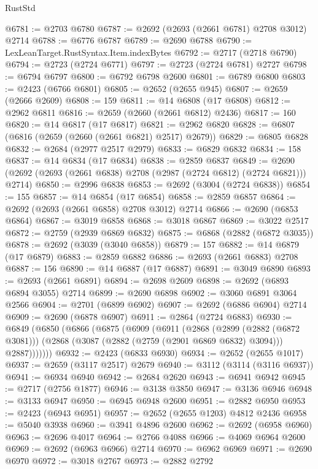 \begin{lexlean}{RustStd}
\begin{coremodule}
{\begin{coremodule}
{{{{{{{{{{{{{{{{{{{{{{{{{{{{{{{{{{{{{{{@6781 := @2703 @6780
@6787 := @2692 (@2693 (@2661 @6781) @2708 @3012) @2714
@6788 := @6776 @6787
@6789 := @2690 @6788
@6790 := LexLeanTarget.RustSyntax.Item.indexBytes
@6792 := @2717 (@2718 @6790)
@6794 := @2723 (@2724 @6771)
@6797 := @2723 (@2724 @6781) @2727
@6798 := @6794 @6797
@6800 := @6792 @6798 @2600
@6801 := @6789 @6800
@6803 := @2423 (@6766 @6801)
@6805 := @2652 (@2655 @945)
@6807 := @2659 (@2666 @2609)
@6808 := 159
@6811 := @14 @6808 (@17 @6808)
@6812 := @2962 @6811
@6816 := @2659 (@2660 (@2661 @6812) @2436)
@6817 := 160
@6820 := @14 @6817 (@17 @6817)
@6821 := @2962 @6820
@6828 := @6807 (@6816 (@2659 (@2660 (@2661 @6821) @2517) @2679))
@6829 := @6805 @6828
@6832 := @2684 (@2977 @2517 @2979)
@6833 := @6829 @6832
@6834 := 158
@6837 := @14 @6834 (@17 @6834)
@6838 := @2859 @6837
@6849 := @2690 (@2692 (@2693 (@2661 @6838) @2708 (@2987 (@2724 @6812) (@2724 @6821))) @2714)
@6850 := @2996 @6838
@6853 := @2692 (@3004 (@2724 @6838))
@6854 := 155
@6857 := @14 @6854 (@17 @6854)
@6858 := @2859 @6857
@6864 := @2692 (@2693 (@2661 @6858) @2708 @3012) @2714
@6866 := @2690 (@6853 @6864)
@6867 := @3019 @6858
@6868 := @3018 @6867
@6869 := @3022 @2517
@6872 := @2759 (@2939 @6869 @6832)
@6875 := @6868 (@2882 (@6872 @3035))
@6878 := @2692 (@3039 (@3040 @6858))
@6879 := 157
@6882 := @14 @6879 (@17 @6879)
@6883 := @2859 @6882
@6886 := @2693 (@2661 @6883) @2708
@6887 := 156
@6890 := @14 @6887 (@17 @6887)
@6891 := @3049 @6890
@6893 := @2693 (@2661 @6891)
@6894 := @2698 @2609
@6898 := @2692 (@6893 @6894 @3055) @2714
@6899 := @2690 @6898
@6902 := @3060 @6891 @3064 @2566
@6904 := @2701 (@6899 @6902)
@6907 := @2692 (@6886 @6904) @2714
@6909 := @2690 (@6878 @6907)
@6911 := @2864 (@2724 @6883)
@6930 := @6849
    (@6850
      (@6866
        (@6875
          (@6909
            (@6911
              (@2868
                (@2899 (@2882 (@6872 @3081)))
                (@2868 (@3087 (@2882 (@2759 (@2901 @6869 @6832) @3094))) @2887)))))))
@6932 := @2423 (@6833 @6930)
@6934 := @2652 (@2655 @1017)
@6937 := @2659 (@3117 @2517) @2679
@6940 := @3112 (@3114 (@3116 @6937))
@6941 := @6934 @6940
@6942 := @2684 @2620
@6943 := @6941 @6942
@6945 := @2717 (@2756 @1877)
@6946 := @3138 @3850
@6947 := @3136 @6946
@6948 := @3133 @6947
@6950 := @6945 @6948 @2600
@6951 := @2882 @6950
@6953 := @2423 (@6943 @6951)
@6957 := @2652 (@2655 @1203) @4812 @2436
@6958 := @5040 @3938
@6960 := @3941 @4896 @2600
@6962 := @2692 (@6958 @6960)
@6963 := @2696 @4017
@6964 := @2766 @4088
@6966 := @4069 @6964 @2600
@6969 := @2692 (@6963 @6966) @2714
@6970 := @6962 @6969
@6971 := @2690 @6970
@6972 := @3018 @2767
@6973 := @2882 @2792
}}}}}}}}}}}}}}}}}}}}}}}}}}}}}}}}}}}}}}}
\end{coremodule}}
\end{coremodule}
\end{lexlean}
